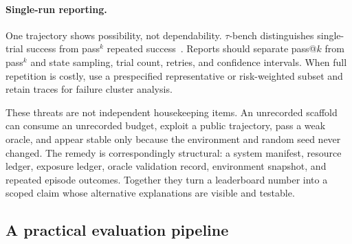 \paragraph{Single-run reporting.}
One trajectory shows possibility, not dependability. $\tau$-bench distinguishes single-trial success from pass$^k$ repeated success~\cite{yao2024taubench}. Reports should separate pass@${k}$ from pass$^k$ and state sampling, trial count, retries, and confidence intervals. When full repetition is costly, use a prespecified representative or risk-weighted subset and retain traces for failure cluster analysis.

These threats are not independent housekeeping items. An unrecorded scaffold can consume an unrecorded budget, exploit a public trajectory, pass a weak oracle, and appear stable only because the environment and random seed never changed. The remedy is correspondingly structural: a system manifest, resource ledger, exposure ledger, oracle validation record, environment snapshot, and repeated episode outcomes. Together they turn a leaderboard number into a scoped claim whose alternative explanations are visible and testable.

\subsection{A practical evaluation pipeline}

